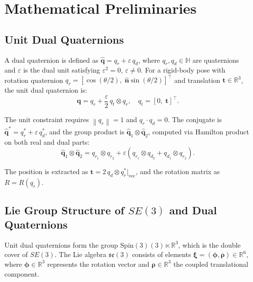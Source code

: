 \documentclass[journal]{IEEEtran}
\newcommand{\dq}{\hat{\bm{q}}}           %
\newcommand{\se}{\mathfrak{se}(3)}        %
\newcommand{\SE}{SE(3)}                   %
\newcommand{\Spin}{\mathrm{Spin}(3)}      %
\newcommand{\R}{\mathbb{R}}              %
\newcommand{\norm}[1]{\left\| #1 \right\|}
\begin{document}
\section{Mathematical Preliminaries}

\subsection{Unit Dual Quaternions}

A dual quaternion is defined as $\dq = q_r + \varepsilon\, q_d$, where $q_r, q_d \in \mathbb{H}$ are quaternions and $\varepsilon$ is the dual unit satisfying $\varepsilon^2 = 0$, $\varepsilon \neq 0$. For a rigid-body pose with rotation quaternion $q_r = [\cos(\theta/2),\; \hat{\bm{n}} \sin(\theta/2)]^\top$ and translation $\bm{t} \in \R^3$, the unit dual quaternion is:
\begin{equation}
    \dq = q_r + \frac{\varepsilon}{2}\, q_t \otimes q_r, \quad q_t = [0,\; \bm{t}]^\top.
    \label{eq:dq_pose}
\end{equation}

The unit constraint requires $\norm{q_r} = 1$ and $q_r \cdot q_d = 0$. The conjugate is $\dq^* = q_r^* + \varepsilon\, q_d^*$, and the group product is $\dq_1 \otimes \dq_2$, computed via Hamilton product on both real and dual parts:
\begin{equation}
    \dq_1 \otimes \dq_2 = q_{r_1} \otimes q_{r_2} + \varepsilon\left(q_{r_1} \otimes q_{d_2} + q_{d_1} \otimes q_{r_2}\right).
\end{equation}

The position is extracted as $\bm{t} = 2\, q_d \otimes q_r^*\big|_{\text{vec}}$, and the rotation matrix as $R = R(q_r)$.

\subsection{Lie Group Structure of $\SE$ and Dual Quaternions}

Unit dual quaternions form the group $\Spin(3) \ltimes \R^3$, which is the double cover of $\SE$. The Lie algebra $\se$ consists of elements $\bm{\xi} = (\bm{\phi}, \bm{\rho}) \in \R^6$, where $\bm{\phi} \in \R^3$ represents the rotation vector and $\bm{\rho} \in \R^3$ the coupled translational component.
\end{document}
